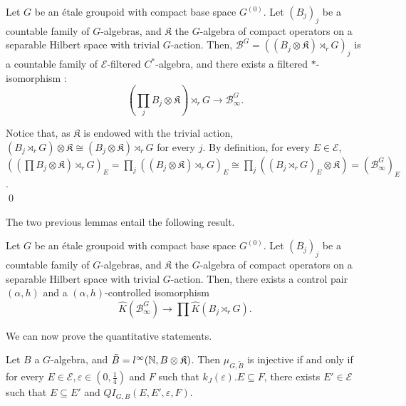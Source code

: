 \begin{lem} Let $G$ be an étale groupoid with compact base space $G^{(0)}$. Let $(B_j)_j$ be a countable family of $G$-algebras, and $\mathfrak K$ the $G$-algebra of compact operators on a separable Hilbert space with trivial $G$-action. Then, $\mathcal B^G = ((B_j\otimes \mathfrak K)\rtimes_r G)_j$ is a countable family of $\mathcal E$-filtered $C^*$-algebra, and there exists a filtered $*$-isomorphism :
\[ (\prod_j B_j\otimes\mathfrak K)\rtimes_r G \rightarrow  \mathcal B^G_\infty.\]
\end{lem}

\begin{dem} Notice that, as $\mathfrak K$ is endowed with the trivial action, $(B_j\rtimes_r G)\otimes\mathfrak K \cong (B_j\otimes\mathfrak K)\rtimes_r G$ for every $j$. By definition, for every $E\in \mathcal E$,  $\left( (\prod B_j\otimes\mathfrak K)\rtimes_r G \right)_E = \prod_j \left( (B_j\otimes\mathfrak K)\rtimes_r G\right)_E \cong \prod_j \left((B_j\rtimes_r G)_E \otimes \mathfrak K \right) = (\mathcal B^G_\infty )_E$.\\
\qed
\end{dem}

The two previous lemmas entail the following result.

\begin{cor} \label{controlledprod} Let $G$ be an étale groupoid with compact base space $G^{(0)}$. Let $(B_j)_j$ be a countable family of $G$-algebras, and $\mathfrak K$ the $G$-algebra of compact operators on a separable Hilbert space with trivial $G$-action. Then, there exists a control pair $(\alpha, h)$ and a $(\alpha, h)$-controlled isomorphism
\[ \hat K(\mathcal B^G_\infty) \rightarrow \prod \hat K(B_j\rtimes_r G). \]
\end{cor}
We can now prove the quantitative statements.\\

\begin{thm}\label{Quant1}
Let $B$ a $G$-algebra, and $\tilde B = l^\infty(\mathbb N,B\otimes \mathfrak K)$. Then $\mu_{G,\tilde B}$ is injective if and only if for every $E\in\mathcal E,\varepsilon\in(0,\frac{1}{4})$ and $F$ such that $k_J(\varepsilon).E\subseteq F$, there exists $E' \in\mathcal E$ such that $E\subseteq E'$ and $QI_{G,B}(E,E',\varepsilon,F)$. 
\end{thm}

